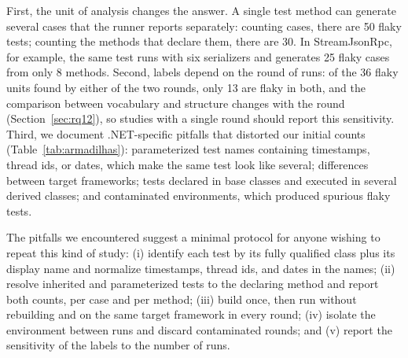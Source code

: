  First, the unit of analysis changes the answer. A single test method can generate several cases that the runner reports separately: counting cases, there are 50 flaky tests; counting the methods that declare them, there are 30. In StreamJsonRpc, for example, the same test runs with six serializers and generates 25 flaky cases from only 8 methods. Second, labels depend on the round of runs: of the 36 flaky units found by either of the two rounds, only 13 are flaky in both, and the comparison between vocabulary and structure changes with the round (Section~\ref{sec:rq12}), so studies with a single round should report this sensitivity. Third, we document .NET-specific pitfalls that distorted our initial counts (Table~\ref{tab:armadilhas}): parameterized test names containing timestamps, thread ids, or dates, which make the same test look like several; differences between target frameworks; tests declared in base classes and executed in several derived classes; and contaminated environments, which produced spurious flaky tests.

 The pitfalls we encountered suggest a minimal protocol for anyone wishing to repeat this kind of study: (i) identify each test by its fully qualified class plus its display name and normalize timestamps, thread ids, and dates in the names; (ii) resolve inherited and parameterized tests to the declaring method and report both counts, per case and per method; (iii) build once, then run without rebuilding and on the same target framework in every round; (iv) isolate the environment between runs and discard contaminated rounds; and (v) report the sensitivity of the labels to the number of runs. 
